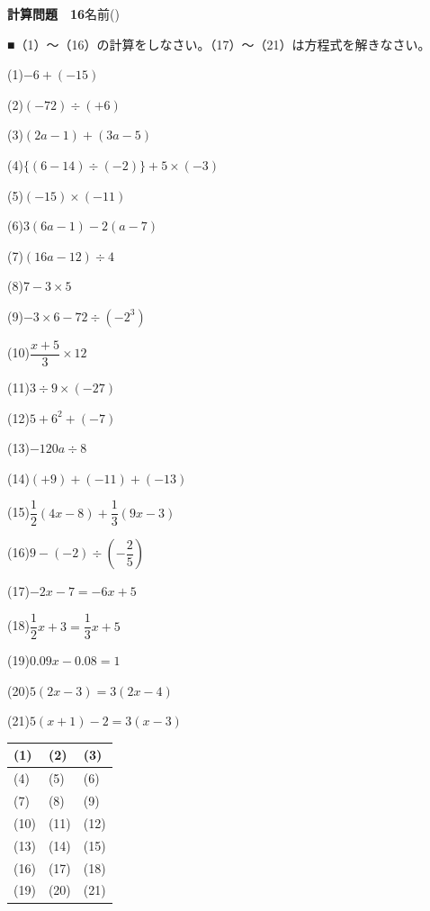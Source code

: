 \documentclass[a4paper,11pt]{ltjsarticle}
\newlength{\qcol}\setlength{\qcol}{0.47\textwidth}
\newlength{\qgap}
\newlength{\anscolw}\setlength{\anscolw}{0.30\textwidth}
\newlength{\ansh}
\newcommand{\Q}[2]{\parbox[t]{\qcol}{\raggedright (#1)\hspace{0.6em}$\displaystyle #2$}}
\newcommand{\QR}[4]{\Q{#1}{#2}\hfill\Q{#3}{#4}\par\vspace{\qgap}}
\newcommand{\anscell}[1]{\rule[-\ansdrop]{0pt}{\ansh}(#1)}
\newlength{\ansdrop}
\begin{document}
{\large\bfseries 計算問題　16}\hfill 名前(\underline{\hspace{32mm}})\par\vspace{3mm}
■（1）〜（16）の計算をしなさい。（17）〜（21）は方程式を解きなさい。\par\vspace{3mm}
\setlength{\qgap}{5.4mm}
\QR{1}{-6+(-15)}{2}{(-72)\div(+6)}
\QR{3}{(2a-1)+(3a-5)}{4}{\{(6-14)\div(-2)\}+5\times(-3)}
\QR{5}{(-15)\times(-11)}{6}{3(6a-1)-2(a-7)}
\QR{7}{(16a-12)\div4}{8}{7-3\times5}
\QR{9}{-3\times6-72\div(-2^3)}{10}{\dfrac{x+5}{3}\times12}
\QR{11}{3\div9\times(-27)}{12}{5+6^2+(-7)}
\QR{13}{-120a\div8}{14}{(+9)+(-11)+(-13)}
\QR{15}{\dfrac{1}{2}(4x-8)+\dfrac{1}{3}(9x-3)}{16}{9-(-2)\div\left(-\dfrac{2}{5}\right)}
\QR{17}{-2x-7=-6x+5}{18}{\dfrac{1}{2}x+3=\dfrac{1}{3}x+5}
\QR{19}{0.09x-0.08=1}{20}{5(2x-3)=3(2x-4)}
\vspace{1mm}
\Q{21}{5(x+1)-2=3(x-3)}\par\vspace{3mm}
\setlength{\ansh}{9.5mm}\setlength{\ansdrop}{6mm}%
\begin{center}\begin{tabular}{|p{\anscolw}|p{\anscolw}|p{\anscolw}|}\hline
\anscell{1} & \anscell{2} & \anscell{3} \\\hline
\anscell{4} & \anscell{5} & \anscell{6} \\\hline
\anscell{7} & \anscell{8} & \anscell{9} \\\hline
\anscell{10} & \anscell{11} & \anscell{12} \\\hline
\anscell{13} & \anscell{14} & \anscell{15} \\\hline
\anscell{16} & \anscell{17} & \anscell{18} \\\hline
\anscell{19} & \anscell{20} & \anscell{21} \\\hline
\end{tabular}\end{center}
\end{document}
